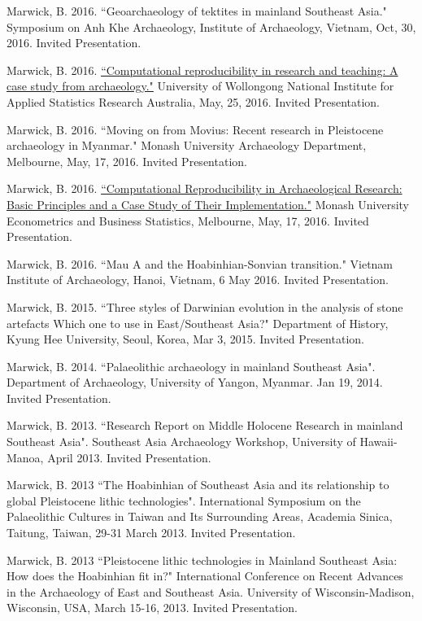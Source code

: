\ind Marwick, B. 2016. ``Geoarchaeology of tektites in mainland Southeast Asia." Symposium on Anh Khe Archaeology, Institute of Archaeology, Vietnam, Oct, 30, 2016. Invited Presentation.

\ind Marwick, B. 2016. \href{https://github.com/benmarwick/UOW-NIASRA-2016-talk}{``Computational reproducibility in research and teaching: A case study from archaeology."} University of Wollongong National Institute for Applied Statistics Research Australia, May, 25, 2016. Invited Presentation.

\ind Marwick, B. 2016. ``Moving on from Movius: Recent research in Pleistocene archaeology in Myanmar." Monash University Archaeology Department, Melbourne, May, 17, 2016. Invited Presentation.

\ind Marwick, B. 2016. \href{https://github.com/benmarwick/Monash-Wombat-2016-talk}{``Computational Reproducibility in Archaeological Research: Basic Principles and a Case Study of Their Implementation."} Monash University Econometrics and Business Statistics, Melbourne, May, 17, 2016. Invited Presentation.

\ind Marwick, B. 2016. ``Mau A and the Hoabinhian-Sonvian transition." Vietnam Institute of Archaeology, Hanoi, Vietnam, 6 May 2016. Invited Presentation.

\ind Marwick, B. 2015. ``Three styles of Darwinian evolution in the analysis of stone artefacts Which one to use in East/Southeast Asia?" Department of History, Kyung Hee University, Seoul, Korea, Mar 3, 2015. Invited Presentation.

\ind Marwick, B. 2014. ``Palaeolithic archaeology in mainland Southeast Asia". Department of Archaeology, University of Yangon, Myanmar. Jan 19, 2014. Invited Presentation.

\ind Marwick, B. 2013. ``Research Report on Middle Holocene Research in mainland Southeast Asia". Southeast Asia Archaeology Workshop, University of Hawaii-Manoa, April 2013. Invited Presentation.

\ind Marwick, B. 2013 ``The Hoabinhian of Southeast Asia and its relationship to global Pleistocene lithic technologies". International Symposium on the Palaeolithic Cultures in Taiwan and Its Surrounding Areas, Academia Sinica, Taitung, Taiwan, 29-31 March 2013.  Invited Presentation.

\ind Marwick, B. 2013 ``Pleistocene lithic technologies in Mainland Southeast Asia: How does the Hoabinhian fit in?"  International Conference on Recent Advances in the Archaeology of East and Southeast Asia. University of Wisconsin-Madison, Wisconsin, USA, March 15-16, 2013. Invited Presentation.

